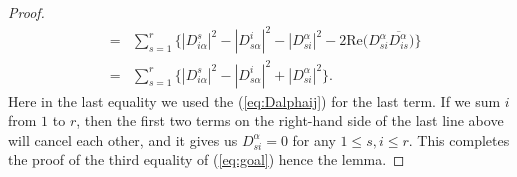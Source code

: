 \documentclass[10pt,a4paper]{amsart}
\begin{document}
\begin{proof}
\begin{eqnarray*}
& = & \sum_{s=1}^r  \{  |D^s_{i\alpha}|^2 -  |D^i_{s\alpha}|^2- |D^{\alpha}_{si}|^2 -  2\mbox{Re}  \big( D^{\alpha}_{si}\overline{D^{\alpha}_{is}}  \big) \} \nonumber \\
& = & \sum_{s=1}^r  \{  |D^s_{i\alpha}|^2 -  |D^i_{s\alpha}|^2 + |D^{\alpha}_{si}|^2  \}.
\end{eqnarray*}
Here in the last equality we used the (\ref{eq:Dalphaij}) for the last term. If we sum $i$ from $1$ to $r$, then the first two terms on the right-hand side of the last line above will cancel each other, and it gives us $D^{\alpha}_{si}=0$ for any $1\leq s,i\leq r$. This completes the proof of the third equality of (\ref{eq:goal}) hence the lemma. 
\end{proof}
\end{document}
